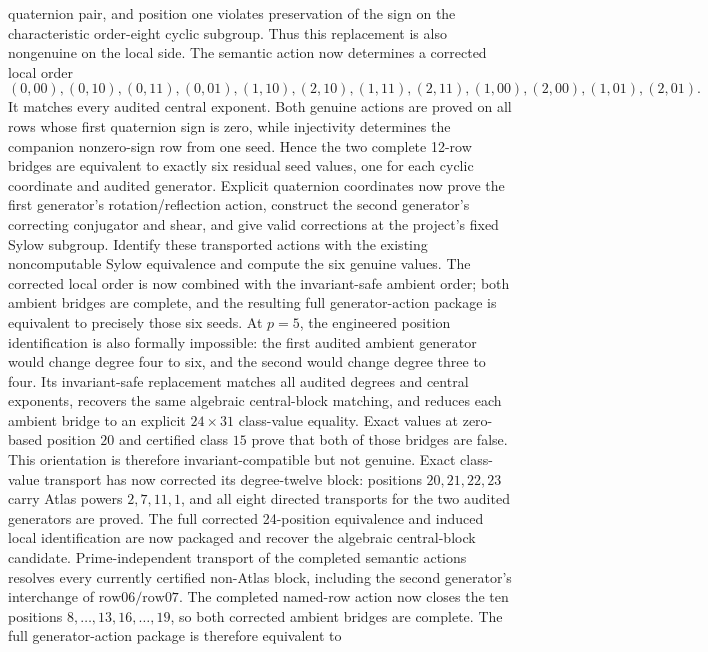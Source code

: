 \documentclass[11pt]{article}
\begin{document}
\begin{enumerate}[label=\textbf{P2.A6.\arabic*.},leftmargin=*]
  quaternion pair, and position one violates preservation of the sign on
  the characteristic order-eight cyclic subgroup.  Thus this replacement
  is also nongenuine on the local side.  The semantic action now determines
  a corrected local order
  \[
    (0,00),(0,10),(0,11),(0,01),(1,10),(2,10),
    (1,11),(2,11),(1,00),(2,00),(1,01),(2,01).
  \]
  It matches every audited central exponent.  Both genuine actions are
  proved on all rows whose first quaternion sign is zero, while injectivity
  determines the companion nonzero-sign row from one seed.  Hence the two
  complete 12-row bridges are equivalent to exactly six residual seed
  values, one for each cyclic coordinate and audited generator.  Explicit
  quaternion coordinates now prove the first generator's
  rotation/reflection action, construct the second generator's correcting
  conjugator and shear, and give valid corrections at the project's fixed
  Sylow subgroup.  Identify these transported actions with the existing
  noncomputable Sylow equivalence and compute the six genuine values.  The
  corrected local order is now combined with the invariant-safe ambient
  order; both ambient bridges are complete, and the resulting full
  generator-action package is equivalent to precisely those six seeds.
  At \(p=5\), the engineered position identification is also formally
  impossible: the first audited ambient generator would change degree
  four to six, and the second would change degree three to four.  Its
  invariant-safe replacement matches all audited degrees and central
  exponents, recovers the same algebraic central-block matching, and
  reduces each ambient bridge to an explicit \(24\times31\) class-value
  equality.  Exact values at zero-based position \(20\) and certified
  class \(15\) prove that both of those bridges are false.  This
  orientation is therefore invariant-compatible but not genuine.  Exact
  class-value transport has now corrected its degree-twelve block:
  positions \(20,21,22,23\) carry Atlas powers \(2,7,11,1\), and all eight
  directed transports for the two audited generators are proved.  The
  full corrected 24-position equivalence and induced local identification
  are now packaged and recover the algebraic central-block candidate.
  Prime-independent transport of the completed semantic actions resolves
  every currently certified non-Atlas block, including the second
  generator's interchange of \(\mathrm{row06}/\mathrm{row07}\).
  The completed named-row action now closes the ten positions
  \(8,\ldots,13,16,\ldots,19\), so both corrected ambient bridges are
  complete.  The full generator-action package is therefore equivalent to

\end{enumerate}
\end{document}
